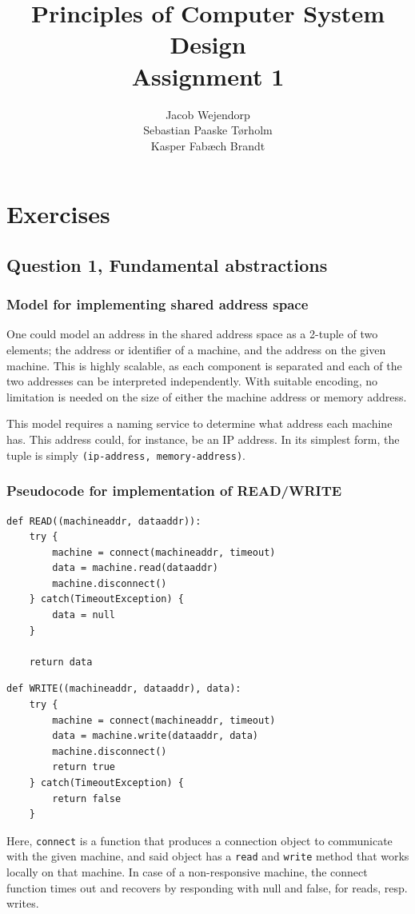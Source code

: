 \documentclass[11pt,a4paper]{article}
\title{Principles of Computer System Design\\Assignment 1}
\author{Jacob Wejendorp\\Sebastian Paaske Tørholm\\Kasper Fabæch Brandt}
\begin{document}
\maketitle
\section{Exercises}
\subsection{Question 1, Fundamental abstractions}
\subsubsection{Model for implementing shared address space}
One could model an address in the shared address space as a 2-tuple of two
elements; the address or identifier of a machine, and the address on the given
machine. This is highly scalable, as each component is separated and each of
the two addresses can be interpreted independently. With suitable encoding,
no limitation is needed on the size of either the machine address or memory
address.

This model requires a naming service to determine what address each machine
has. This address could, for instance, be an IP address.
In its simplest form, the tuple is simply \texttt{(ip-address, memory-address)}.

\subsubsection{Pseudocode for implementation of READ/WRITE}

\begin{verbatim}
def READ((machineaddr, dataaddr)):
    try {
        machine = connect(machineaddr, timeout)
        data = machine.read(dataaddr)
        machine.disconnect()
    } catch(TimeoutException) {
        data = null
    }

    return data
\end{verbatim}

\begin{verbatim}
def WRITE((machineaddr, dataaddr), data):
    try {
        machine = connect(machineaddr, timeout)
        data = machine.write(dataaddr, data)
        machine.disconnect()
        return true
    } catch(TimeoutException) {
        return false
    }
\end{verbatim}

Here, \texttt{connect} is a function that produces a connection object to
communicate with the given machine, and said object has a \texttt{read} and
\texttt{write} method that works locally on that machine. In case of a non-responsive
machine, the connect function times out and recovers by responding with null and false,
for reads, resp. writes.
\end{document}
